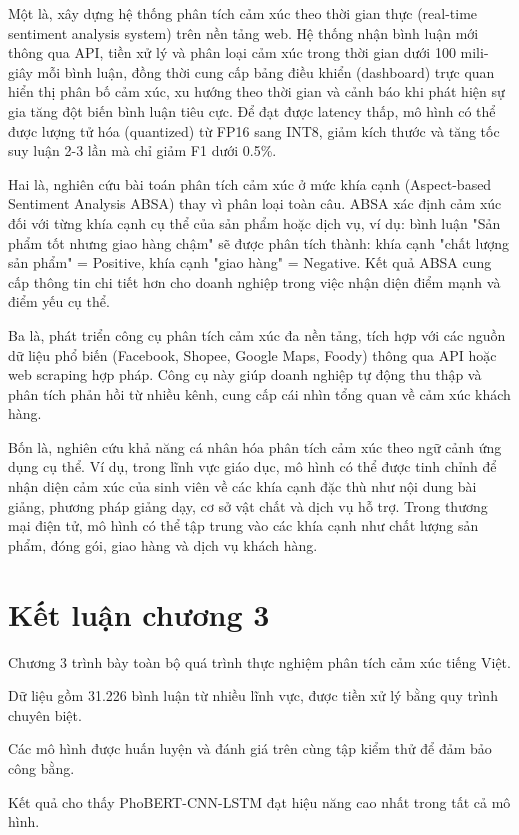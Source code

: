 \documentclass[14pt, a4paper]{report}
\begin{document}
Một là, xây dựng hệ thống phân tích cảm xúc theo thời gian thực (real-time sentiment analysis system) trên nền tảng web. Hệ thống nhận bình luận mới thông qua API, tiền xử lý và phân loại cảm xúc trong thời gian dưới 100 mili-giây mỗi bình luận, đồng thời cung cấp bảng điều khiển (dashboard) trực quan hiển thị phân bố cảm xúc, xu hướng theo thời gian và cảnh báo khi phát hiện sự gia tăng đột biến bình luận tiêu cực. Để đạt được latency thấp, mô hình có thể được lượng tử hóa (quantized) từ FP16 sang INT8, giảm kích thước và tăng tốc suy luận 2-3 lần mà chỉ giảm F1 dưới 0.5\%.


Hai là, nghiên cứu bài toán phân tích cảm xúc ở mức khía cạnh (Aspect-based Sentiment Analysis \- ABSA) thay vì phân loại toàn câu. ABSA xác định cảm xúc đối với từng khía cạnh cụ thể của sản phẩm hoặc dịch vụ, ví dụ: bình luận "Sản phẩm tốt nhưng giao hàng chậm" sẽ được phân tích thành: khía cạnh "chất lượng sản phẩm" = Positive, khía cạnh "giao hàng" = Negative. Kết quả ABSA cung cấp thông tin chi tiết hơn cho doanh nghiệp trong việc nhận diện điểm mạnh và điểm yếu cụ thể.


Ba là, phát triển công cụ phân tích cảm xúc đa nền tảng, tích hợp với các nguồn dữ liệu phổ biến (Facebook, Shopee, Google Maps, Foody) thông qua API hoặc web scraping hợp pháp. Công cụ này giúp doanh nghiệp tự động thu thập và phân tích phản hồi từ nhiều kênh, cung cấp cái nhìn tổng quan về cảm xúc khách hàng.


Bốn là, nghiên cứu khả năng cá nhân hóa phân tích cảm xúc theo ngữ cảnh ứng dụng cụ thể. Ví dụ, trong lĩnh vực giáo dục, mô hình có thể được tinh chỉnh để nhận diện cảm xúc của sinh viên về các khía cạnh đặc thù như nội dung bài giảng, phương pháp giảng dạy, cơ sở vật chất và dịch vụ hỗ trợ. Trong thương mại điện tử, mô hình có thể tập trung vào các khía cạnh như chất lượng sản phẩm, đóng gói, giao hàng và dịch vụ khách hàng.


\section{Kết luận chương 3}


Chương 3 trình bày toàn bộ quá trình thực nghiệm phân tích cảm xúc tiếng Việt.

Dữ liệu gồm 31.226 bình luận từ nhiều lĩnh vực, được tiền xử lý bằng quy trình chuyên biệt.

Các mô hình được huấn luyện và đánh giá trên cùng tập kiểm thử để đảm bảo công bằng.

Kết quả cho thấy PhoBERT-CNN-LSTM đạt hiệu năng cao nhất trong tất cả mô hình.
\end{document}
